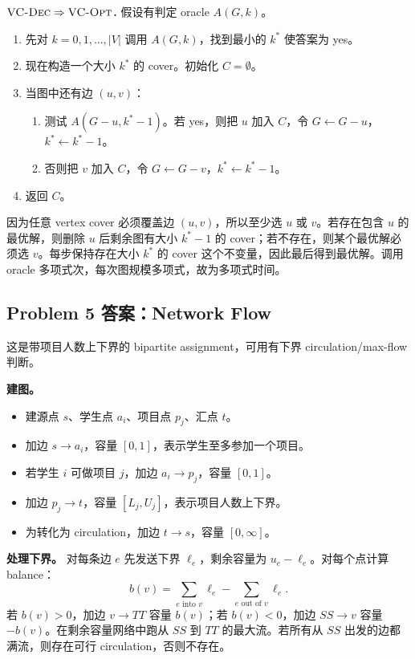 \documentclass[UTF8,a4paper,11pt]{ctexart}
\begin{document}
\textbf{$\textsc{VC-Dec}\Rightarrow\textsc{VC-Opt}$.} 假设有判定 oracle $A(G,k)$。
\begin{enumerate}
  \item 先对 $k=0,1,\ldots,|V|$ 调用 $A(G,k)$，找到最小的 $k^*$ 使答案为 yes。
  \item 现在构造一个大小 $k^*$ 的 cover。初始化 $C=\emptyset$。
  \item 当图中还有边 $(u,v)$：
  \begin{enumerate}
    \item 测试 $A(G-u,k^*-1)$。若 yes，则把 $u$ 加入 $C$，令 $G\leftarrow G-u$，$k^*\leftarrow k^*-1$。
    \item 否则把 $v$ 加入 $C$，令 $G\leftarrow G-v$，$k^*\leftarrow k^*-1$。
  \end{enumerate}
  \item 返回 $C$。
\end{enumerate}
因为任意 vertex cover 必须覆盖边 $(u,v)$，所以至少选 $u$ 或 $v$。若存在包含 $u$ 的最优解，则删除 $u$ 后剩余图有大小 $k^*-1$ 的 cover；若不存在，则某个最优解必须选 $v$。每步保持存在大小 $k^*$ 的 cover 这个不变量，因此最后得到最优解。调用 oracle 多项式次，每次图规模多项式，故为多项式时间。

\subsection*{Problem 5 答案：Network Flow}

这是带项目人数上下界的 bipartite assignment，可用有下界 circulation/max-flow 判断。

\textbf{建图。}
\begin{itemize}
  \item 建源点 $s$、学生点 $a_i$、项目点 $p_j$、汇点 $t$。
  \item 加边 $s\to a_i$，容量 $[0,1]$，表示学生至多参加一个项目。
  \item 若学生 $i$ 可做项目 $j$，加边 $a_i\to p_j$，容量 $[0,1]$。
  \item 加边 $p_j\to t$，容量 $[L_j,U_j]$，表示项目人数上下界。
  \item 为转化为 circulation，加边 $t\to s$，容量 $[0,\infty]$。
\end{itemize}

\textbf{处理下界。} 对每条边 $e$ 先发送下界 $\ell_e$，剩余容量为 $u_e-\ell_e$。对每个点计算 balance：
\[
b(v)=\sum_{e\text{ into }v}\ell_e-\sum_{e\text{ out of }v}\ell_e.
\]
若 $b(v)>0$，加边 $v\to TT$ 容量 $b(v)$；若 $b(v)<0$，加边 $SS\to v$ 容量 $-b(v)$。在剩余容量网络中跑从 $SS$ 到 $TT$ 的最大流。若所有从 $SS$ 出发的边都满流，则存在可行 circulation，否则不存在。
\end{document}
